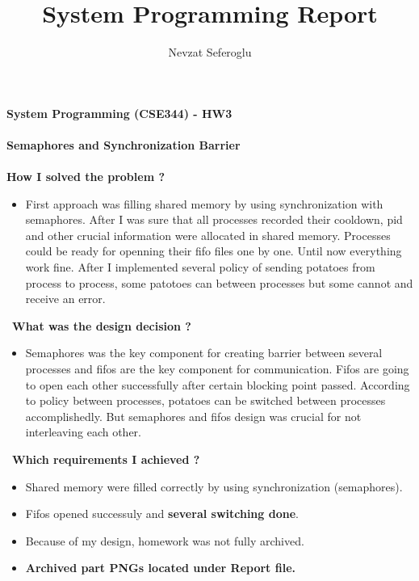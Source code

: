 \documentclass[12pt]{article}
\title{System Programming Report}
\author {Nevzat Seferoglu}
\begin{document}
\begin{center} \Large \end{center}
{\large \textbf{System Programming (CSE344) - HW3}} \\\\
{\large \textbf{Semaphores and Synchronization Barrier}} \\\\
\textbf{How I solved the problem ?}
\begin{itemize}
    \item{First approach was filling shared memory by using synchronization with semaphores. After I was sure that all processes recorded their cooldown, pid and other crucial information were allocated in shared memory. Processes could be ready for openning their fifo files one by one. Until now everything work fine. After I implemented several policy of sending potatoes from process to process, some patotoes can between processes but some cannot and receive an error.}
\end{itemize}\
\textbf{What was the design decision ?}
\begin{itemize}
    \item{Semaphores was the key component for creating barrier between several processes and fifos are the key component for communication. Fifos are going to open each other successfully after certain blocking point passed. According to policy between processes, potatoes can be switched between processes accomplishedly. But semaphores and fifos design was crucial for not interleaving each other.}
\end{itemize}\
\textbf{Which requirements I achieved ?}
\begin{itemize}
    \item{Shared memory were filled correctly by using synchronization (semaphores).}
    \item{Fifos opened successuly and \textbf{several switching done}.}
    \item{Because of my design, homework was not fully archived.}
    \item{\textbf{Archived part PNGs located under Report file.}}
\end{itemize}\
\end{document}
